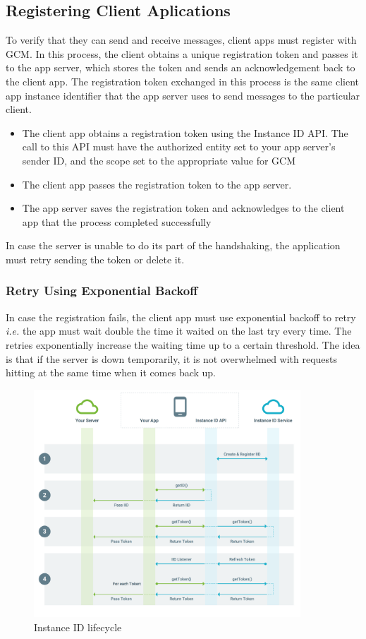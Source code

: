 \subsection{Registering Client Aplications}
To verify that they can send and receive messages, client apps must register with GCM. In this process, the client obtains a unique registration token and passes it to the app server, which stores the token and sends an acknowledgement back to the client app. The registration token exchanged in this process is the same client app instance identifier that the app server uses to send messages to the particular client.
\begin{itemize}
	\item The client app obtains a registration token using the Instance ID API. The call to this API must have the authorized entity set to your app server's sender ID, and the scope set to the appropriate value for GCM 
	\item The client app passes the registration token to the app server.
	\item The app server saves the registration token and acknowledges to the client app that the process completed successfully
\end{itemize}
In case the server is unable to do its part of the handshaking, the application must retry sending the token or delete it.
\subsubsection{Retry Using Exponential Backoff}
 In case the registration fails, the client app must use exponential backoff to retry \emph{i.e.} the app must wait double the time it waited on the last try every time.  The retries exponentially increase the waiting time up to a certain threshold. The idea is that if the server is down temporarily, it is not overwhelmed with requests hitting at the same time when it comes back up.
 \newpage
 \begin{figure}[h]
\centering
\includegraphics[width=10cm]{images/iid-lifecycle.png}
\caption{\label{fig:iid}Instance ID lifecycle}
\end{figure}
